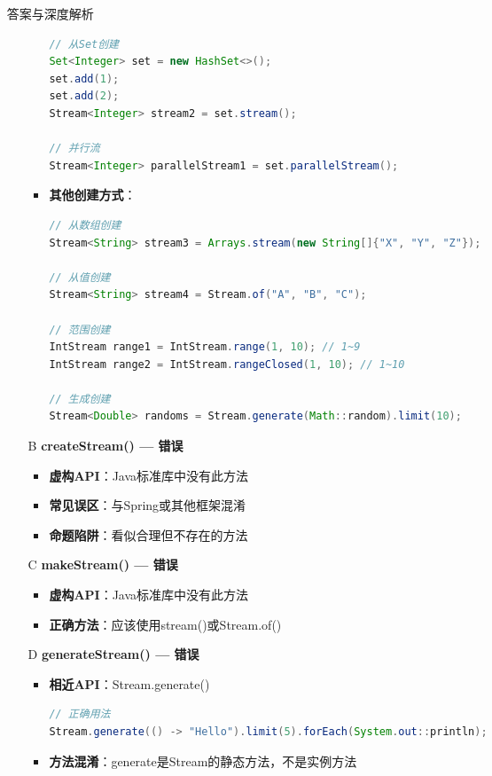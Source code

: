 \documentclass[12pt, a4paper]{ctexart}
\begin{document}
\begin{enumerate}[label=\textbf{\arabic*.}]
\begin{bluebox}{答案与深度解析}
\begin{itemize}[leftmargin=*, nosep, label={}]
\begin{itemize}[label={}, leftmargin=*, nosep]
\begin{lstlisting}[language=Java]
// 从Set创建
Set<Integer> set = new HashSet<>();
set.add(1);
set.add(2);
Stream<Integer> stream2 = set.stream();

// 并行流
Stream<Integer> parallelStream1 = set.parallelStream();
				      \end{lstlisting}
				            \item \textbf{其他创建方式}：
				                  \begin{lstlisting}[language=Java]
// 从数组创建
Stream<String> stream3 = Arrays.stream(new String[]{"X", "Y", "Z"});

// 从值创建
Stream<String> stream4 = Stream.of("A", "B", "C");

// 范围创建
IntStream range1 = IntStream.range(1, 10); // 1~9
IntStream range2 = IntStream.rangeClosed(1, 10); // 1~10

// 生成创建
Stream<Double> randoms = Stream.generate(Math::random).limit(10);
				      \end{lstlisting}
			            \end{itemize}

			      \item[B] \textbf{createStream() — 错误}
			            \begin{itemize}[label={}, leftmargin=*, nosep]
				            \item \textbf{虚构API}：Java标准库中没有此方法
				            \item \textbf{常见误区}：与Spring或其他框架混淆
				            \item \textbf{命题陷阱}：看似合理但不存在的方法
			            \end{itemize}

			      \item[C] \textbf{makeStream() — 错误}
			            \begin{itemize}[label={}, leftmargin=*, nosep]
				            \item \textbf{虚构API}：Java标准库中没有此方法
				            \item \textbf{正确方法}：应该使用stream()或Stream.of()
			            \end{itemize}

			      \item[D] \textbf{generateStream() — 错误}
			            \begin{itemize}[label={}, leftmargin=*, nosep]
				            \item \textbf{相近API}：Stream.generate()
				                  \begin{lstlisting}[language=Java]
// 正确用法
Stream.generate(() -> "Hello").limit(5).forEach(System.out::println);
				      \end{lstlisting}
				            \item \textbf{方法混淆}：generate是Stream的静态方法，不是实例方法
			            \end{itemize}
		      \end{itemize}


\end{bluebox}
\end{enumerate}
\end{document}
